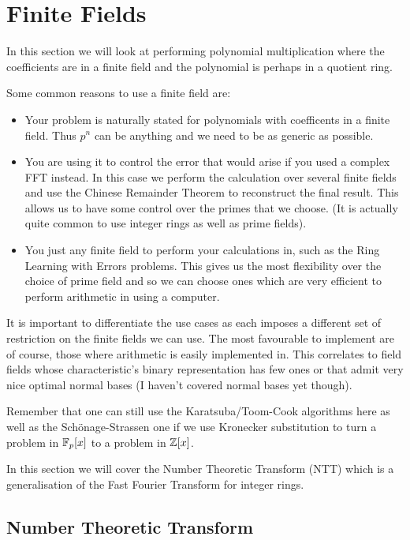 \chapter{Finite Fields}\label{finite-fields}

In this section we will look at performing polynomial multiplication where the coefficients are in a finite field and the polynomial is perhaps in a quotient ring.

Some common reasons to use a finite field are:
\begin{itemize}
\item Your problem is naturally stated for polynomials with coefficents
in a finite field. Thus $p^n$ can be anything and we need to be as generic as possible.
\item You are using it to control the error that would arise if you used a complex FFT instead. In this case we perform the calculation over several finite fields and use the Chinese Remainder Theorem to reconstruct the final result. This allows us to have some control over the primes that we choose. (It is actually quite common to use integer rings as well as prime fields).
\item You just any finite field to perform your calculations in, such as the Ring Learning with Errors problems. This gives us the most flexibility over the choice of prime field and so we can choose ones which are very efficient to perform arithmetic in using a computer.
\end{itemize}

It is important to differentiate the use cases as each imposes a different set of restriction on the finite fields we can use. The most favourable to implement are of course, those where arithmetic is easily implemented in. This correlates to field fields whose characteristic's binary representation has few ones or that admit very nice optimal normal bases (I haven't covered normal bases yet though).

Remember that one can still use the Karatsuba/Toom-Cook algorithms here as well as the Sch\"{o}nage-Strassen one if we use Kronecker substitution to turn a problem in $\mathbb{F}_p[x]$ to a problem in ${\mathbb Z}[x]$.

In this section we will cover the Number Theoretic Transform (NTT) which is a generalisation of the Fast Fourier Transform for integer rings. 

\section{Number Theoretic Transform}
\label{sec:ntt}

